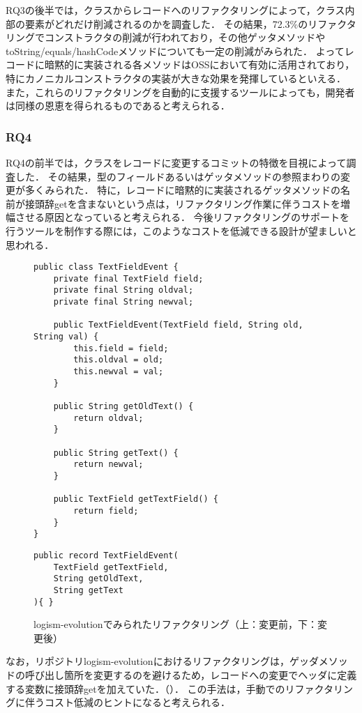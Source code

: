RQ3の後半では，クラスからレコードへのリファクタリングによって，クラス内部の要素がどれだけ削減されるのかを調査した．
その結果，72.3\%のリファクタリングでコンストラクタの削減が行われており，その他ゲッタメソッドやtoString/equals/hashCodeメソッドについても一定の削減がみられた．
よってレコードに暗黙的に実装される各メソッドはOSSにおいて有効に活用されており，特にカノニカルコンストラクタの実装が大きな効果を発揮しているといえる．
また，これらのリファクタリングを自動的に支援するツールによっても，開発者は同様の恩恵を得られるものであると考えられる．

\subsubsection{RQ4}

RQ4の前半では，クラスをレコードに変更するコミットの特徴を目視によって調査した．
その結果，型のフィールドあるいはゲッタメソッドの参照まわりの変更が多くみられた．
特に，レコードに暗黙的に実装されるゲッタメソッドの名前が接頭辞getを含まないという点は，リファクタリング作業に伴うコストを増幅させる原因となっていると考えられる．
今後リファクタリングのサポートを行うツールを制作する際には，このようなコストを低減できる設計が望ましいと思われる．

\begin{figure}[t]
\begin{lstlisting}
public class TextFieldEvent {
    private final TextField field;
    private final String oldval;
    private final String newval;
    
    public TextFieldEvent(TextField field, String old, String val) {
        this.field = field;
        this.oldval = old;
        this.newval = val;
    }
    
    public String getOldText() {
        return oldval;
    }
    
    public String getText() {
        return newval;
    }
    
    public TextField getTextField() {
        return field;
    }
}
\end{lstlisting}
\begin{lstlisting}
public record TextFieldEvent(
    TextField getTextField,
    String getOldText,
    String getText
){ }
\end{lstlisting}
\caption{logism-evolutionでみられたリファクタリング（上：変更前，下：変更後）}
\label{unique_usage}
\end{figure}
なお，リポジトリlogism-evolutionにおけるリファクタリングは，ゲッダメソッドの呼び出し箇所を変更するのを避けるため，レコードへの変更でヘッダに定義する変数に接頭辞getを加えていた．（）．
この手法は，手動でのリファクタリングに伴うコスト低減のヒントになると考えられる．


